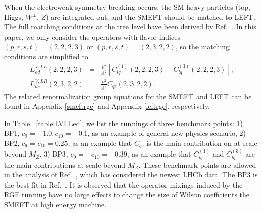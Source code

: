 \documentclass[a4paper,11pt]{article}
\begin{document}
When the electroweak symmetry breaking occurs, the SM heavy particles (top, Higgs,  $W^\pm$,  $Z$) are integrated out, and the SMEFT should be matched to LEFT. 
The full matching conditions at the tree level have been derived by Ref.~\cite{Jenkins:2017jig}.
In this paper, we only consider the operators with flavor indices $(p,r,s,t)=(2,2,2,3)$ or $(p,r,s,t)=(2,3,2,2)$, so the matching conditions are simplified to 
\begin{eqnarray}
    L^{V,LL}_{ed}(2,2,2,3) &=& \frac{v^2}{\Lambda^2}\left[C^{(1)}_{lq}(2,2,2,3)+C^{(3)}_{lq}(2,2,2,3)\right],  \label{match:VLLed}\\
    L^{V,LR}_{de}(2,3,2,2)&=& \frac{v^2}{\Lambda^2}C_{qe}(2,3,2,2). \label{match:VLRde}
\end{eqnarray}
The related renormalization group equations for the SMEFT and LEFT can be found in Appendix \ref{smeftrge} and Appendix \ref{leftrge}, respectively.

In Table.~\ref{table:LVLLed}, we list the runnings of three benchmark points: 
1) BP1, $c_{9}=-1.0, c_{10}=-0.1$, as an example of general new physics scenario, 
2) BP2, $c_{9}=c_{10}=0.25$, as an example that $C_{qe}$ is the main contribution on at scale beyond $M_Z$,
3) BP3, $c_{9}=-c_{10}=-0.39$, as an example that $C^{(1)}_{lq}$ and $C^{(3)}_{lq}$ are the main contributions at scale beyond $M_Z$. 
These benchmark points are allowed in the analysis of Ref.~\cite{Ciuchini:2022wbq}, 
which has considered the newest LHCb data.
The BP3 is the best fit in Ref.~\cite{Altmannshofer:2021qrr}. 
It is observed that the operator mixings induced by the RGE running have no large effects to change the size of Wilson coefficients the SMEFT at high energy machine.
\end{document}
